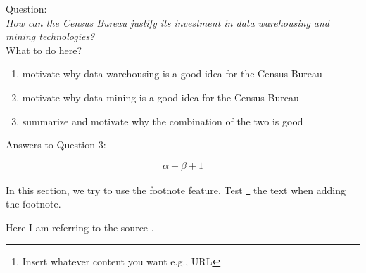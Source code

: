 Question:\\
\emph{
    How can the Census Bureau justify its investment in data warehousing and mining
technologies?
}\\

What to do here?
\begin{enumerate}
    \item motivate why data warehousing is a good idea for the Census Bureau
    \item motivate why data mining is a good idea for the Census Bureau
    \item summarize and motivate why the combination of the two is good 
  \end{enumerate}

Answers to Question 3:

\begin{equation}
\alpha + \beta + 1
\end{equation}

In this section, we try to use the footnote feature. 
Test \footnote{Insert whatever content you want e.g., URL} the text when adding the footnote.

Here I am referring to the source \cite{DataScience}.